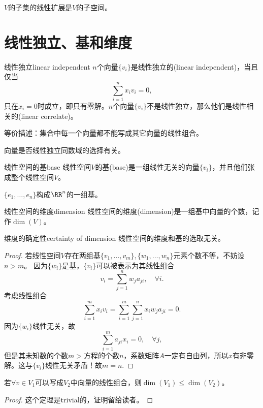 \begin{corollary}
	$V$的子集的线性扩展是$V$的子空间。
\end{corollary}

\section{线性独立、基和维度}
\begin{definition}{线性独立}{linear independent}
	$n$个向量$\{v_i\}$是线性独立的(linear independent)，当且仅当
	\[
		\sum_{i=1}^nx_iv_i=0,
	\]
	只在$x_i=0$时成立，即只有零解。$n$个向量$\{v_i\}$不是线性独立，那么他们是线性相关的(linear correlate)。
	
	等价描述：集合中每一个向量都不能写成其它向量的线性组合。
\end{definition}
\begin{remark}
	向量是否线性独立同数域的选择有关。
\end{remark}
\begin{definition}{线性空间的基}{base}
	线性空间$V$的基(base)是一组线性无关的向量$\{v_i\}$，并且他们张成整个线性空间$V$。
\end{definition}
\begin{example}
	{}{}
	$\{e_1,\ldots,e_n\}$构成$\RR^n$的一组基。
\end{example}
\begin{definition}{线性空间的维度}{dimension}
	线性空间的维度(dimension)是一组基中向量的个数，记作$\dim(V)$。
\end{definition}
\begin{theorem}{维度的确定性}{certainty of dimension}
	线性空间的维度和基的选取无关。
\end{theorem}
\begin{proof}
	若线性空间$V$存在两组基$\{v_1,\ldots,v_m\},\{w_1,\ldots,w_n\}$元素个数不等，不妨设$n>m$。
	因为$\{w_i\}$是基，$\{v_i\}$可以被表示为其线性组合
	\[
		v_i=\sum_{j=1}^nw_ja_{ji},\quad\forall i.
	\]
	考虑线性组合
	\[
		\sum_{i=1}^mx_iv_i=\sum_{i=1}^m\sum_{j=1}^nx_iw_ja_{ji}=0.
	\]
	因为$\{w_i\}$线性无关，故
	\[
		\sum_{i=1}^ma_{ji}x_i=0,\quad\forall j,
	\]
	但是其未知数的个数$m>$方程的个数$n$，系数矩阵$A$一定有自由列，所以$x$有非零解。这与$\{v_i\}$线性无关矛盾！故$m=n.$
\end{proof}

\begin{theorem}{}{}
	若$\forall v\in V_1$可以写成$V_2$中向量的线性组合，则$\dim(V_1)\leqslant\dim(V_2)$。
\end{theorem}

\begin{proof}
	这个定理是trivial的，证明留给读者。
\end{proof}

